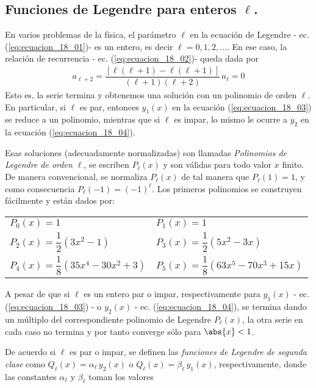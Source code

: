 \subsection{Funciones de Legendre para enteros $\ell$.}
En varios problemas de la física, el parámetro $\ell$ en la ecuación de Legendre - ec. (\ref{eq:ecuacion_18_01})- es un entero, es decir $\ell = 0, 1, 2, \ldots$. En ese caso, la relación de recurrencia - ec. (\ref{eq:ecuacion_18_02})- queda dada por
\begin{align*}
a_{\ell + 2} = \dfrac{[ \ell (\ell + 1) - \ell (\ell + 1) ]}{(\ell + 1)(\ell + 2)}  \, a_{\ell} = 0
\end{align*}
Esto es, la serie termina y obtenemos una solución con un polinomio de orden $\ell$. En particular, si $\ell$ es par, entonces $y_{1}(x)$ en la ecuación (\ref{eq:ecuacion_18_03}) se reduce a un polinomio, mientras que si $\ell$ es impar, lo mismo le ocurre a $y_{2}$ en la ecuación (\ref{eq:ecuacion_18_04}).
\par
Esas soluciones (adecuadamente normalizadas) son llamadas \emph{Polinomios de Legendre de orden $\ell$}, se escriben $P_{\ell}(x)$ y son válidas para todo valor $x$ finito. De manera convencional, se normaliza $P_{\ell}(x)$ de tal manera que $P_{\ell}(1) =  1$, y como consecuencia $P_{\ell}(-1) = (-1)^{\ell}$. Los primeros polinomios se construyen fácilmente y están dados por:
\begingroup
\setlength{\tabcolsep}{20pt}
\renewcommand{\arraystretch}{2}
\begin{center}
\begin{tabular}{l l}
$P_{0}(x) = 1 $ & $P_{1}(x) = 1 $ \\
$P_{2}(x) = \dfrac{1}{2} (3 x^{2} - 1)$ & $P_{3}(x) = \dfrac{1}{2} (5 x^{2} - 3 x)$ \\ 
$P_{4}(x) = \dfrac{1}{8} (35 x^{4} - 30 x^{2} + 3)$ & $P_{5}(x) = \dfrac{1}{8} (63 x^{5} - 70 x^{3} + 15 x)$
\end{tabular}
\end{center}
\endgroup
A pesar de que si $\ell$ es un entero par o impar, respectivamente para $y_{1}(x)$ - ec. (\ref{eq:ecuacion_18_03}) - o $y_{2}(x)$ - ec. (\ref{eq:ecuacion_18_04}), se termina dando un múltiplo del correspondiente polinomio de Legendre $P_{\ell}(x)$, la otra serie en cada caso no termina y por tanto converge sólo para $\abs{x} < 1$.
\par
De acuerdo si $\ell$ es par o impar, se definen las \emph{funciones de Legendre de segunda clase} como $Q_{\ell}(x) =  \alpha_{\ell} \, y_{2}(x)$ o $Q_{\ell}(x) = \beta_{\ell} \, y_{1}(x)$, respectivamente, donde las constantes $\alpha_{\ell}$ y $\beta_{\ell}$ toman los valores
